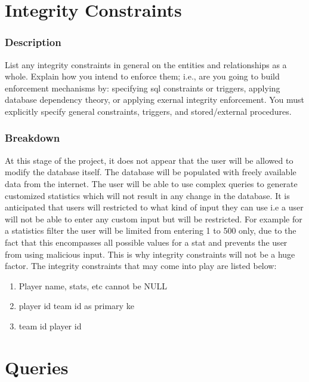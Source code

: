 \documentclass[12pt,letterpaper]{article}
\begin{document}
\clearpage\null

\section{Integrity Constraints}

\subsubsection{Description}
List any integrity constraints in general on the entities and relationships as a
whole. Explain how you intend to enforce them; i.e., are you going to build enforcement
mechanisms by: specifying sql constraints or triggers, applying database dependency theory, or applying exernal integrity enforcement. You must explicitly specify general constraints, triggers, and stored/external procedures.

\subsubsection{Breakdown}
At this stage of the project, it does not appear that the user will be allowed to modify the database itself. The database will be populated with freely available data from the internet. The user will be able to use complex queries to generate customized statistics which will not result in any change in the database. It is anticipated that users will restricted to what kind of input they can use i.e a user will not be able to enter any custom input but will be restricted. For example for a statistics filter the user will be limited from entering 1 to 500 only, due to the fact that this encompasses all possible values for a stat and prevents the user from using malicious input. This is why integrity constraints will not be a huge factor. The integrity constraints that may come into play are listed below:

\begin{enumerate}
\item Player name, stats, etc cannot be NULL
\item player id team id as primary ke
\item team id player id
\end{enumerate}

\clearpage\null

\section{Queries}
\end{document}
